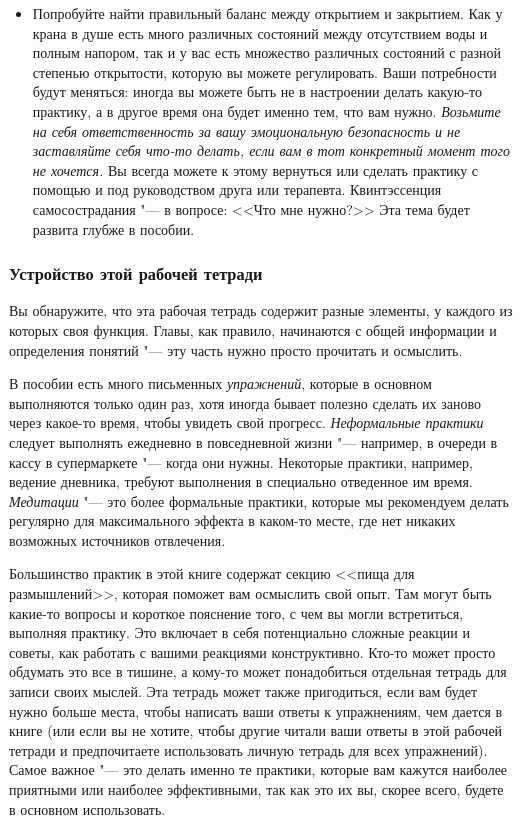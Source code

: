 \begin{itemize}
		\item Попробуйте найти правильный баланс между открытием и закрытием. Как у крана в душе есть много различных состояний между отсутствием воды и полным напором, так и у вас есть множество различных состояний с разной степенью открытости, которую вы можете регулировать. Ваши потребности будут меняться: иногда вы можете быть не в настроении делать какую-то практику, а в другое время она будет именно тем, что вам нужно. \emph{Возьмите на себя ответственность за вашу эмоциональную безопасность и не заставляйте себя что-то делать, если вам в тот конкретный момент того не хочется.} Вы всегда можете к этому вернуться или сделать практику с помощью и под руководством друга или терапевта. Квинтэссенция самосострадания "--- в вопросе: <<Что мне нужно?>> Эта тема будет развита глубже в пособии. 
	\end{itemize}
	
	
	\subsubsection{Устройство этой рабочей тетради}
	
	Вы обнаружите, что эта рабочая тетрадь содержит разные элементы, у каждого из которых своя функция. Главы, как правило, начинаются с общей информации и определения понятий "--- эту часть нужно просто прочитать и осмыслить. 
	
	В пособии есть много письменных \emph{упражнений}, которые в основном выполняются только один раз, хотя иногда бывает полезно сделать их заново через какое-то время, чтобы увидеть свой прогресс. \emph{Неформальные практики} следует выполнять ежедневно в повседневной жизни "--- например, в очереди в кассу в супермаркете "--- когда они нужны. Некоторые практики, например, ведение дневника, требуют выполнения в специально отведенное им время. \emph{Медитации} "--- это более формальные практики, которые мы рекомендуем делать регулярно для максимального эффекта в каком-то месте, где нет никаких возможных источников отвлечения. 
	
	Большинство практик в этой книге содержат секцию <<пища для размышлений>>, которая поможет вам осмыслить свой опыт. Там могут быть какие-то вопросы и короткое пояснение того,  с чем вы могли встретиться, выполняя практику.  Это включает в себя потенциально сложные реакции и советы, как работать с вашими реакциями конструктивно. Кто-то может просто обдумать это все в тишине, а кому-то может понадобиться отдельная тетрадь для записи своих мыслей. Эта тетрадь может также пригодиться, если вам будет нужно больше места, чтобы написать ваши ответы к упражнениям, чем дается в книге (или если вы не хотите, чтобы другие читали ваши ответы в этой рабочей тетради и предпочитаете использовать личную тетрадь для всех упражнений). Самое важное "--- это делать именно те практики, которые вам кажутся наиболее приятными или наиболее эффективными, так как это их вы, скорее всего, будете в основном использовать. 
	
